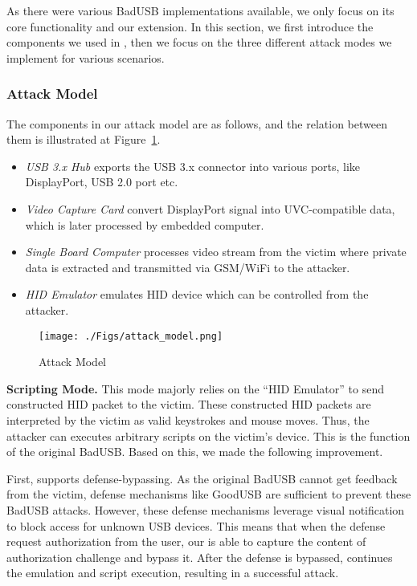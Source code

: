 As there were various BadUSB implementations available, we only focus on its
core functionality and our extension. In this section, we first introduce the
components we used in \tool, then we focus on the three different attack modes
we implement for various scenarios.

\subsubsection{Attack Model}

The components in our attack model are as follows, and the relation between
them is illustrated at Figure~\ref{fig:attack_model}. 

\begin{itemize}
	\item\textit{USB 3.x Hub} exports the USB 3.x connector into various ports, like DisplayPort, USB 2.0 port etc.
	\item\textit{Video Capture Card} convert DisplayPort signal into UVC-compatible data, which is later processed by embedded computer.
	\item\textit{Single Board Computer} processes video stream from the victim where private data is extracted and transmitted via GSM/WiFi to the attacker.
	\item\textit{HID Emulator} emulates HID device which can be controlled from the attacker.
\end{itemize}


\begin{figure}[t]
	\centering
	\texttt{[image: ./Figs/attack\_model.png]}
	\caption{Attack Model}%
	\label{fig:attack_model}
\end{figure}

\textbf{Scripting Mode.} This mode majorly relies on the ``HID Emulator'' to
send constructed HID packet to the victim. These constructed HID packets are
interpreted by the victim as valid keystrokes and mouse moves. Thus, the
attacker can executes arbitrary scripts on the victim's device. This is the
function of the original BadUSB. Based on this, we made the following
improvement.

First, \tool supports defense-bypassing. As the original BadUSB cannot get
feedback from the victim, defense mechanisms like GoodUSB
\cite{tian2015defending} are sufficient to prevent these BadUSB attacks.
However, these defense mechanisms leverage visual notification to block access
for unknown USB devices. This means that when the defense request authorization
from the user, our \tool is able to capture the content of authorization
challenge and bypass it. After the defense is bypassed, \tool continues the
emulation and script execution, resulting in a successful attack.

